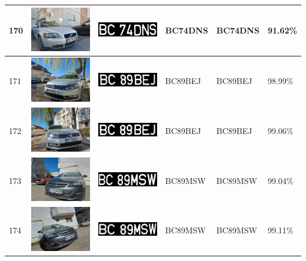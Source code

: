 \documentclass[a4paper,12pt]{report}
\begin{document}
\begin{longtable}{| m{0.6cm} | m{3cm} | m{3cm} | m{1.8cm} | m{1.8cm} | m{1.8cm} |}
        170 & \includegraphics[width=3cm,keepaspectratio]{dataset/106_s1.jpg} & \includegraphics[width=3cm,keepaspectratio]{segmentari/170.jpg} & BC74DNS & BC74DNS & 91.62\% \\ \hline
        171 & \includegraphics[width=3cm,keepaspectratio]{dataset/107_d1.jpg} & \includegraphics[width=3cm,keepaspectratio]{segmentari/171.jpg} & BC89BEJ & BC89BEJ & 98.99\% \\ \hline
        172 & \includegraphics[width=3cm,keepaspectratio]{dataset/107_s1.jpg} & \includegraphics[width=3cm,keepaspectratio]{segmentari/172.jpg} & BC89BEJ & BC89BEJ & 99.06\% \\ \hline
        173 & \includegraphics[width=3cm,keepaspectratio]{dataset/108_d1.jpg} & \includegraphics[width=3cm,keepaspectratio]{segmentari/173.jpg} & BC89MSW & BC89MSW & 99.04\% \\ \hline
        174 & \includegraphics[width=3cm,keepaspectratio]{dataset/108_s1.jpg} & \includegraphics[width=3cm,keepaspectratio]{segmentari/174.jpg} & BC89MSW & BC89MSW & 99.11\% \\ \hline

\end{longtable}
\end{document}
